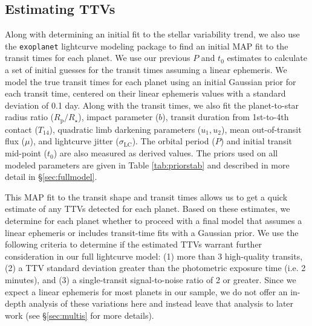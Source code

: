 \documentclass[twocolumn]{aastex63}
\begin{document}
\subsection{Estimating TTVs}
\label{sec:ttvs}

Along with determining an initial fit to the stellar variability trend, we also use the \texttt{exoplanet} lightcurve modeling package to find an initial MAP fit to the transit times for each planet. We use our previous $P$ and $t_0$ estimates to calculate a set of initial guesses for the transit times assuming a linear ephemeris. We model the true transit times for each planet using an initial Gaussian prior for each transit time, centered on their linear ephemeris values with a standard deviation of 0.1 day. Along with the transit times, we also fit the planet-to-star radius ratio ($R_\textrm{p}/R_\star$), impact parameter ($b$), transit duration from 1st-to-4th contact ($T_{14}$), quadratic limb darkening parameters ($u_1, u_2$), mean out-of-transit flux ($\mu$), and lightcurve jitter ($\sigma_\textrm{LC}$). The orbital period ($P$) and initial transit mid-point ($t_0$) are also measured as derived values. The priors used on all modeled parameters are given in Table \ref{tab:priorstab} and described in more detail in \S\ref{sec:fullmodel}. 

This MAP fit to the transit shape and transit times allows us to get a quick estimate of any TTVs detected for each planet. Based on these estimates, we determine for each planet whether to proceed with a final model that assumes a linear ephemeris or includes transit-time fits with a Gaussian prior. We use the following criteria to determine if the estimated TTVs warrant further consideration in our full lightcurve model: (1) more than 3 high-quality transits, (2) a TTV standard deviation greater than the photometric exposure time (i.e. 2 minutes), and (3) a single-transit signal-to-noise ratio of 2 or greater. Since we expect a linear ephemeris for most planets in our sample, we do not offer an in-depth analysis of these variations here and instead leave that analysis to later work (see \S\ref{sec:multis} for more details).
\end{document}
